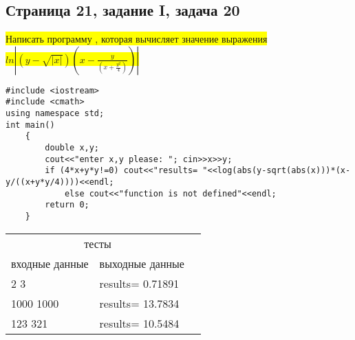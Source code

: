 \documentclass[11pt]{article}
\begin{document}
\newpage
\begin{center}
 {\fontsize{20}{10}\selectfont {Основы программирования на языке с++ ЧАСТЬ 1}}
\end{center}
\begin{flushleft}
\begin{center}
 \section{Страница 21, задание I, задача 20}
\colorbox{yellow}{Написать программу , которая вычисляет значение выражения $ln|(y-\sqrt{|x|})(x-\frac{y}{(x+\frac{y^2}{4})})|$}
\end{center} 
\begin{lstlisting}
#include <iostream>
#include <cmath>
using namespace std;
int main()
	{
		double x,y;
		cout<<"enter x,y please: "; cin>>x>>y;
		if (4*x+y*y!=0)	cout<<"results= "<<log(abs(y-sqrt(abs(x)))*(x-y/((x+y*y/4))))<<endl;
			else cout<<"function is not defined"<<endl;
		return 0;
	}
\end{lstlisting}

\begin{table}[h]\begin{center}\begin{tabular}{|l|l|l}
\cline{1-2}
\multicolumn{2}{|c|}{тесты} &  \\ \cline{1-2}
     входные данные      &       выходные данные    &  \\ \cline{1-2}
         2 3  &      results= 0.71891
    &  \\ \cline{1-2}
            1000 1000  &      results= 13.7834

    &  \\ \cline{1-2}
            123 321  &      results= 10.5484

    &  \\ \cline{1-2}
\end{tabular}\end{center}\end{table}


\end{flushleft}
\end{document}
